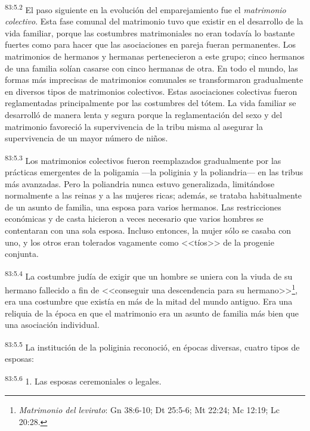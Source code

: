 \par
\textsuperscript{83:5.2} El paso siguiente en la evolución del emparejamiento fue el \textit{matrimonio colectivo}. Esta fase comunal del matrimonio tuvo que existir en el desarrollo de la vida familiar, porque las costumbres matrimoniales no eran todavía lo bastante fuertes como para hacer que las asociaciones en pareja fueran permanentes. Los matrimonios de hermanos y hermanas pertenecieron a este grupo; cinco hermanos de una familia solían casarse con cinco hermanas de otra. En todo el mundo, las formas más imprecisas de matrimonios comunales se transformaron gradualmente en diversos tipos de matrimonios colectivos. Estas asociaciones colectivas fueron reglamentadas principalmente por las costumbres del tótem. La vida familiar se desarrolló de manera lenta y segura porque la reglamentación del sexo y del matrimonio favoreció la supervivencia de la tribu misma al asegurar la supervivencia de un mayor número de niños.

\par
\textsuperscript{83:5.3} Los matrimonios colectivos fueron reemplazados gradualmente por las prácticas emergentes de la poligamia ---la poliginia y la poliandria--- en las tribus más avanzadas. Pero la poliandria nunca estuvo generalizada, limitándose normalmente a las reinas y a las mujeres ricas; además, se trataba habitualmente de un asunto de familia, una esposa para varios hermanos. Las restricciones económicas y de casta hicieron a veces necesario que varios hombres se contentaran con una sola esposa. Incluso entonces, la mujer sólo se casaba con uno, y los otros eran tolerados vagamente como <<tíos>> de la progenie conjunta.

\par
\textsuperscript{83:5.4} La costumbre judía de exigir que un hombre se uniera con la viuda de su hermano fallecido a fin de <<conseguir una descendencia para su hermano>>\footnote{\textit{Matrimonio del levirato}: Gn 38:6-10; Dt 25:5-6; Mt 22:24; Mc 12:19; Lc 20:28.}, era una costumbre que existía en más de la mitad del mundo antiguo. Era una reliquia de la época en que el matrimonio era un asunto de familia más bien que una asociación individual.

\par
\textsuperscript{83:5.5} La institución de la poliginia reconoció, en épocas diversas, cuatro tipos de esposas:

\par
\textsuperscript{83:5.6} 1. Las esposas ceremoniales o legales.

